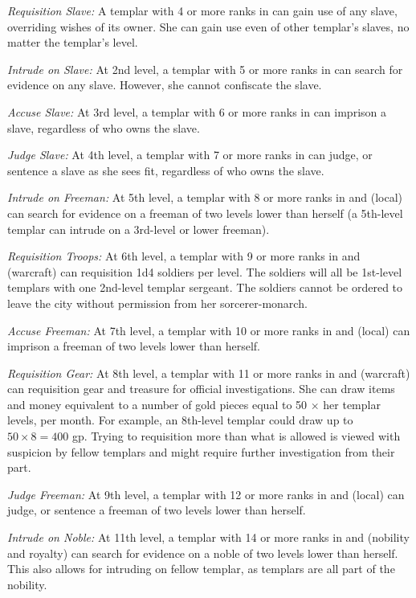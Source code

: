 \textit{Requisition Slave:} A templar with 4 or more ranks in  can gain use of any slave, overriding wishes of its owner. She can gain use even of other templar's slaves, no matter the templar's level.

\textit{Intrude on Slave:} At 2nd level, a templar with 5 or more ranks in  can search for evidence on any slave. However, she cannot confiscate the slave.

\textit{Accuse Slave:} At 3rd level, a templar with 6 or more ranks in  can imprison a slave, regardless of who owns the slave.

\textit{Judge Slave:} At 4th level, a templar with 7 or more ranks in  can judge, or sentence a slave as she sees fit, regardless of who owns the slave.

\textit{Intrude on Freeman:} At 5th level, a templar with 8 or more ranks in  and  (local) can search for evidence on a freeman of two levels lower than herself (a 5th-level templar can intrude on a 3rd-level or lower freeman).

\textit{Requisition Troops:} At 6th level, a templar with 9 or more ranks in  and  (warcraft) can requisition 1d4 soldiers per level. The soldiers will all be 1st-level templars with one 2nd-level templar sergeant. The soldiers cannot be ordered to leave the city without permission from her sorcerer-monarch.

\textit{Accuse Freeman:} At 7th level, a templar with 10 or more ranks in  and  (local) can imprison a freeman of two levels lower than herself.

\textit{Requisition Gear:} At 8th level, a templar with 11 or more ranks in  and  (warcraft) can requisition gear and treasure for official investigations. She can draw items and money equivalent to a number of gold pieces equal to 50 $\times$ her templar levels, per month. For example, an 8th-level templar could draw up to $50\times8=400$ gp. Trying to requisition more than what is allowed is viewed with suspicion by fellow templars and might require further investigation from their part.

\textit{Judge Freeman:} At 9th level, a templar with 12 or more ranks in  and  (local) can judge, or sentence a freeman of two levels lower than herself.

\textit{Intrude on Noble:} At 11th level, a templar with 14 or more ranks in  and  (nobility and royalty) can search for evidence on a noble of two levels lower than herself. This also allows for intruding on fellow templar, as templars are all part of the nobility.

